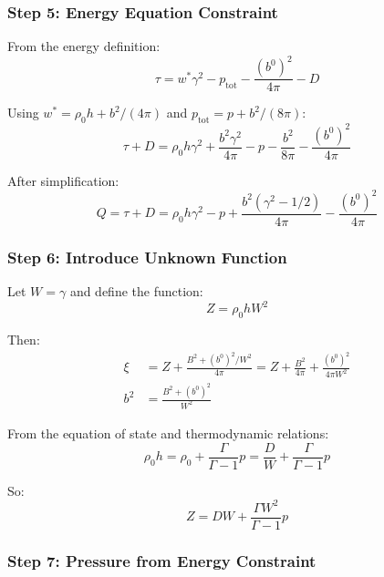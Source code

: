 \documentclass[12pt,a4paper]{article}
\begin{document}
\subsubsection{Step 5: Energy Equation Constraint}

From the energy definition:
\begin{equation}
\tau = w^* \gamma^2 - p_\text{tot} - \frac{(b^0)^2}{4\pi} - D
\label{eq:tau_constraint}
\end{equation}

Using $w^* = \rho_0 h + b^2/(4\pi)$ and $p_\text{tot} = p + b^2/(8\pi)$:
\begin{equation}
\tau + D = \rho_0 h \gamma^2 + \frac{b^2 \gamma^2}{4\pi} - p - \frac{b^2}{8\pi} - \frac{(b^0)^2}{4\pi}
\end{equation}

After simplification:
\begin{equation}
Q = \tau + D = \rho_0 h \gamma^2 - p + \frac{b^2(\gamma^2 - 1/2)}{4\pi} - \frac{(b^0)^2}{4\pi}
\label{eq:Q_constraint}
\end{equation}

\subsubsection{Step 6: Introduce Unknown Function}

Let $W = \gamma$ and define the function:
\begin{equation}
Z = \rho_0 h W^2
\label{eq:Z_def}
\end{equation}

Then:
\begin{align}
\xi &= Z + \frac{B^2 + (b^0)^2/W^2}{4\pi} = Z + \frac{B^2}{4\pi} + \frac{(b^0)^2}{4\pi W^2} \\
b^2 &= \frac{B^2 + (b^0)^2}{W^2}
\end{align}

From the equation of state and thermodynamic relations:
\begin{equation}
\rho_0 h = \rho_0 + \frac{\Gamma}{\Gamma-1}p = \frac{D}{W} + \frac{\Gamma}{\Gamma-1}p
\label{eq:rho_h_from_D}
\end{equation}

So:
\begin{equation}
Z = D W + \frac{\Gamma W^2}{\Gamma-1}p
\label{eq:Z_from_p}
\end{equation}

\subsubsection{Step 7: Pressure from Energy Constraint}
\end{document}
